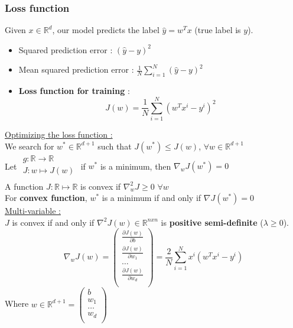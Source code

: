 \documentclass[../main.tex]{subfiles}
\begin{document}
\subsubsection{Loss function}
Given $x\in \mathbb{R}^d$, our model predicts the label $\hat{y} = w^T x$ (true label is $y$).\\

\begin{itemize}
    \item Squared prediction error : $(\hat{y}-y)^2$\\
    \item Mean squared prediction error : $\frac{1}{N} \sum_{i=1}^N (\hat{y}-y)^2$\\
    \item \textbf{Loss function for training} : \begin{equation}
        J(w) = \frac{1}{N} \sum_{i=1}^N (w^Tx^i-y^i)^2
    \end{equation}
\end{itemize}

\quad \underline{Optimizing the loss function :}\\
We search for $w^* \in \mathbb{R}^{d+1}$ such that $J(w^*) \leq J(w)$, $\forall w \in \mathbb{R}^{d+1}$\\

Let $\begin{matrix}
    g:\mathbb{R} \rightarrow \mathbb{R}\\
    J : w\mapsto J(w)\\
\end{matrix}$ if $w^*$ is a minimum, then $\nabla_w J(w^*) = 0$\\

A function $J: \mathbb{R}\mapsto \mathbb{R}$ is convex if $\nabla_w^2 J \geq 0$ $\forall w$\\

For \textbf{convex function}, $w^*$ is a minimum if and only if $\nabla J(w^*) = 0$\\

\quad \underline{Multi-variable :}\\
$J$ is convex if and only if $\nabla^2 J(w) \in \mathbb{R}^{nxn}$ is \textbf{positive semi-definite} ($\lambda \geq 0$).\\
\begin{equation}
    \nabla_w J(w) = \begin{pmatrix}
        \frac{\partial J(w)}{\partial b}\\ \frac{\partial J(w)}{\partial w_1}\\ \dots \\ \frac{\partial J(w)}{\partial w_d}\\
    \end{pmatrix} = \frac{2}{N} \sum_{i=1}^N x^i(w^Tx^i-y^i)
\end{equation}
Where $w\in \mathbb{R}^{d+1} = \begin{pmatrix}
    b\\ w_1 \\ \dots \\ w_d\\
\end{pmatrix}$\\
\end{document}
